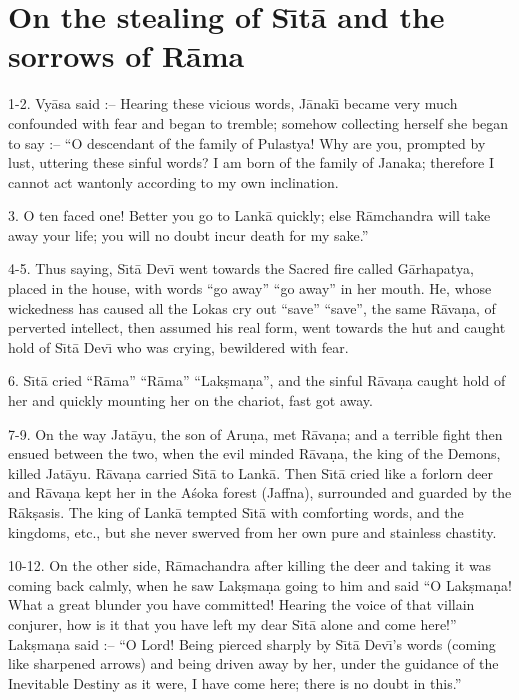 \chapter{On the stealing of S\={\i}t\=a and the sorrows of R\=ama}

1-2. Vy\=asa said :-- Hearing these vicious words, J\=anak\={\i} became very much confounded with fear and began to tremble; somehow collecting herself she began to say :-- ``O descendant of the family of Pulastya! Why are you, prompted by lust, uttering these sinful words? I am born of the family of Janaka; therefore I cannot act wantonly according to my own inclination.

3. O ten faced one! Better you go to Lank\=a quickly; else R\=amchandra will take away your life; you will no doubt incur death for my sake.''

4-5. Thus saying, S\={\i}t\=a Dev\={\i} went towards the Sacred fire called G\=arhapatya, placed in the house, with words ``go away'' ``go away'' in her mouth. He, whose wickedness has caused all the Lokas cry out ``save'' ``save'', the same R\=ava\d{n}a, of perverted intellect, then assumed his real form, went towards the hut and caught hold of S\={\i}t\=a Dev\={\i} who was crying, bewildered with fear.

6. S\={\i}t\=a cried ``R\=ama'' ``R\=ama'' ``Lak\d{s}ma\d{n}a'', and the sinful R\=ava\d{n}a caught hold of her and quickly mounting her on the chariot, fast got away.

7-9. On the way Jat\=ayu, the son of Aru\d{n}a, met R\=ava\d{n}a; and a terrible fight then ensued between the two, when the evil minded R\=ava\d{n}a, the king of the Demons, killed Jat\=ayu. R\=ava\d{n}a carried S\={\i}t\=a to Lank\=a. Then S\={\i}t\=a cried like a forlorn deer and R\=ava\d{n}a kept her in the A\'soka forest (Jaffna),
surrounded and guarded by the R\=ak\d{s}asis. The king of Lank\=a tempted S\={\i}t\=a with comforting words, and the kingdoms, etc., but she never swerved from her own pure and stainless chastity.

10-12. On the other side, R\=amachandra after killing the deer and taking it was coming back calmly, when he saw Lak\d{s}ma\d{n}a going to him and said ``O Lak\d{s}ma\d{n}a! What a great blunder you have committed! Hearing the voice of that villain conjurer, how is it that you have left my dear S\={\i}t\=a alone and come here!'' Lak\d{s}ma\d{n}a said :-- ``O Lord! Being pierced sharply by S\={\i}t\=a Dev\={\i}'s words (coming like sharpened arrows) and being driven away by her, under the guidance of the Inevitable Destiny as it were, I have come here; there is no doubt in this.''

